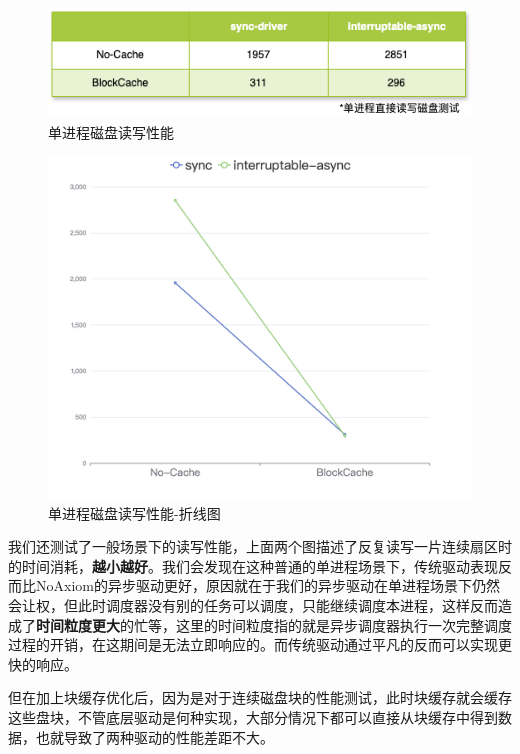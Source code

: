 \documentclass{article}
\begin{document}
\begin{figure}[H]
    \centering
    \includegraphics[width=0.7\linewidth]{assets//fs/perf-directly-on-disk.png}
    \caption{单进程磁盘读写性能}
\end{figure}\begin{figure}[H]
    \centering
    \includegraphics[width=0.7\linewidth]{assets//fs/perf-directly-on-disk-line.png}
    \caption{单进程磁盘读写性能-折线图}
\end{figure}

我们还测试了一般场景下的读写性能，上面两个图描述了反复读写一片连续扇区时的时间消耗，\textbf{越小越好}。我们会发现在这种普通的单进程场景下，传统驱动表现反而比NoAxiom的异步驱动更好，原因就在于我们的异步驱动在单进程场景下仍然会让权，但此时调度器没有别的任务可以调度，只能继续调度本进程，这样反而造成了\textbf{时间粒度更大}的忙等，这里的时间粒度指的就是异步调度器执行一次完整调度过程的开销，在这期间是无法立即响应的。而传统驱动通过平凡的反而可以实现更快的响应。

但在加上块缓存优化后，因为是对于连续磁盘块的性能测试，此时块缓存就会缓存这些盘块，不管底层驱动是何种实现，大部分情况下都可以直接从块缓存中得到数据，也就导致了两种驱动的性能差距不大。
\end{document}
